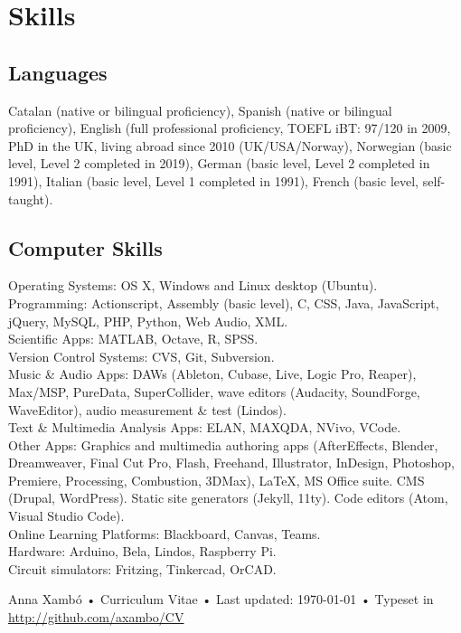 \documentclass[10pt, a4paper]{article}
\begin{document}
\section*{Skills}

\subsection*{Languages}
\noindent

Catalan (native or bilingual proficiency), Spanish (native or bilingual proficiency), English (full professional proficiency, TOEFL iBT: 97/120 in 2009, PhD in the UK, living abroad since 2010 (UK/USA/Norway), Norwegian (basic level, Level 2 completed in 2019), German (basic level, Level 2 completed in 1991), Italian (basic level, Level 1 completed in 1991), French (basic level, self-taught).

\subsection*{Computer Skills}
\noindent

Operating Systems: OS X, Windows and Linux desktop (Ubuntu).\\
Programming: Actionscript, Assembly (basic level), C, CSS, Java, JavaScript, jQuery, MySQL, PHP, Python, Web Audio, XML.\\
Scientific Apps: MATLAB, Octave, R, SPSS.\\
Version Control Systems: CVS, Git, Subversion.\\
Music \& Audio Apps: DAWs (Ableton, Cubase, Live, Logic Pro, Reaper), Max/MSP, PureData, SuperCollider, wave editors (Audacity, SoundForge, WaveEditor), audio measurement \& test (Lindos).\\
Text \& Multimedia Analysis Apps: ELAN, MAXQDA, NVivo, VCode.\\
Other Apps: Graphics and multimedia authoring apps (AfterEffects, Blender, Dreamweaver, Final Cut Pro, Flash, Freehand, Illustrator, InDesign, Photoshop, Premiere, Processing, Combustion, 3DMax), LaTeX, MS Office suite. CMS (Drupal, WordPress). Static site generators (Jekyll, 11ty). Code editors (Atom, Visual Studio Code).\\
Online Learning Platforms: Blackboard, Canvas, Teams.\\
Hardware: Arduino, Bela, Lindos, Raspberry Pi.\\
Circuit simulators: Fritzing, Tinkercad, OrCAD.

\vfill{}

\begin{center}
{\scriptsize  Anna Xambó •\- Curriculum Vitae •\- Last updated: \today\- •\- %
Typeset in \href{http://nitens.org/taraborelli/cvtex}{
\XeTeX }\\
\href{http://github.com/axambo/CV}{http://github.com/axambo/CV}}
\end{center}
\end{document}
